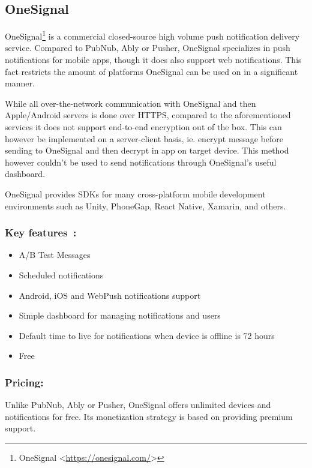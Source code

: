 \subsection{OneSignal}
OneSignal\footnote{OneSignal <\url{https://onesignal.com/}>} is a commercial closed-source high volume push notification delivery service. Compared to PubNub, Ably or Pusher, OneSignal specializes in push notifications for mobile apps, though it does also support web notifications. This fact restricts the amount of platforms OneSignal can be used on in a significant manner.

While all over-the-network communication with OneSignal and then Apple/Android servers is done over HTTPS, compared to the aforementioned services it does not support end-to-end encryption out of the box\cite{onesignal-https}. This can however be implemented on a server-client basis, ie. encrypt message before sending to OneSignal and then decrypt in app on target device. This method however couldn't be used to send notifications through OneSignal's useful dashboard.

OneSignal provides SDKs for many cross-platform mobile development environments such as Unity, PhoneGap, React Native, Xamarin, and others.

\subsubsection*{Key features~\protect\cite{onesignal}:}
\begin{itemize}
\item A/B Test Messages
\item Scheduled notifications
\item Android, iOS and WebPush notifications support
\item Simple dashboard for managing notifications and users
\item Default time to live for notifications when device is offline is 72 hours\cite{onesignal-ttl}
\item Free
\end{itemize}

\subsubsection*{Pricing:}

Unlike PubNub, Ably or Pusher, OneSignal offers unlimited devices and notifications for free. Its monetization strategy is based on providing premium support.

